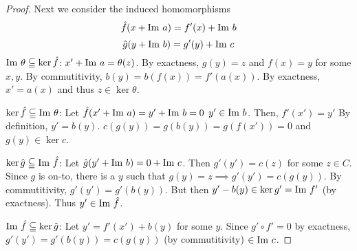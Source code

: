 \documentclass{article}
\theoremstyle{definition}
\theoremstyle{remark}
\begin{document}
\begin{proof}
     Next we consider the induced homomorphisms
     $$\hat{f}(x + \mathrm{Im}\  a) = f'(x) + \mathrm{Im}\  b$$
     $$\hat{g}(y + \mathrm{Im}\  b) = g'(y) + \mathrm{Im}\  c$$
     $\mathrm{Im}\  \theta \subseteqq \ker \hat{f}$: $x' + \mathrm{Im}\  a = \theta(z)$. By exactness, $g(y) = z$ and $f(x) = y$ for some $x, y$. By commutitivity, $b(y) = b(f(x)) = f'(a(x))$. By exactness, $x' = a(x)$  and thus $z \in \ker \theta.$ 
    
     $\ker \hat{f} \subseteqq \mathrm{Im}\  \theta$: Let $\hat{f}(x' + \mathrm{Im}\  a) = y' + \mathrm{Im}\  b = 0$ $y' \in \mathrm{Im}\  b$. Then, $f'(x') = y'$ By definition, $y' = b(y)$. $c(g(y)) = g(b(y)) = g(f(x')) =0$ and $g(y) \in \ker c$.

     $\ker \hat{g} \subseteqq \mathrm{Im}\  \hat{f}$: Let $\hat{g}(y' + \mathrm{Im}\  b) = 0 + \mathrm{Im}\  c$. Then $g'(y') = c(z)$ for some $z \in C$. Since $g$ is on-to, there  is a $y$ such that $g(y) = z \implies g'(y') = c(g(y))$. By commutitivity, $g'(y') = g'(b(y)).$ But then $y' - b(y) \in \ker g' = \mathrm{Im}\  f'$ (by exactness). Thus $y' \in \mathrm{Im}\  \hat{f}$. 

     $\mathrm{Im}\  \hat{f} \subseteqq \ker \hat{g}$: Let $y' = f'(x') + b(y)$ for some $y$. Since $g' \circ f' = 0$ by exactness, $g'(y') = g'(b(y)) = c(g(y))$ (by commutitivity) $\in \mathrm{Im}\  c$. 

  
\end{proof}
\end{document}
